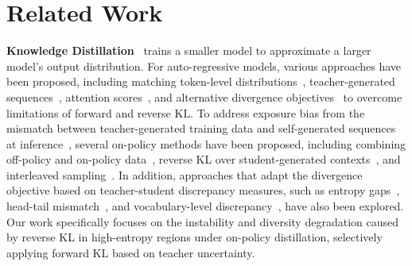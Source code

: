 \section{Related Work}

\textbf{Knowledge Distillation}~\cite{bucilua2006model, hinton2015distilling} trains a smaller model to approximate a larger model's output distribution. For auto-regressive models, various approaches have been proposed, including matching token-level distributions~\cite{sanh2019distilbert}, teacher-generated sequences~\cite{kim2016sequence}, attention scores~\cite{wang2020minilm}, and alternative divergence objectives~\cite{wen2023f, ko2024distillm, shing2025taid} to overcome limitations of forward and reverse KL. To address exposure bias from the mismatch between teacher-generated training data and self-generated sequences at inference~\cite{bengio2015scheduled, ranzato2015sequence}, several on-policy methods have been proposed, including combining off-policy and on-policy data~\cite{lin2020autoregressive, agarwal2024policy}, reverse KL over student-generated contexts~\cite{gu2024minillm, lu2025onpolicydistillation}, and interleaved sampling~\cite{xu2024speculative}. 
In addition, approaches that adapt the divergence objective based on teacher-student discrepancy measures, such as entropy gaps~\cite{amara2022bd}, head-tail mismatch~\cite{wu2025rethinking}, and vocabulary-level discrepancy~\cite{jung2025todi}, have also been explored. Our work specifically focuses on the instability and diversity degradation caused by reverse KL in high-entropy regions under on-policy distillation, selectively applying forward KL based on teacher uncertainty.

